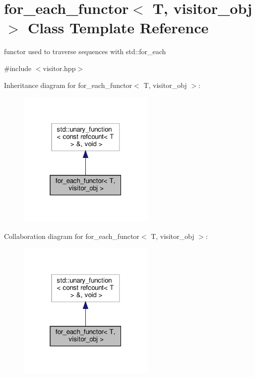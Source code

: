 \hypertarget{classfor__each__functor}{}\section{for\+\_\+each\+\_\+functor$<$ T, visitor\+\_\+obj $>$ Class Template Reference}
\label{classfor__each__functor}


functor used to traverse sequences with std\+::for\+\_\+each  




{\ttfamily \#include $<$visitor.\+hpp$>$}



Inheritance diagram for for\+\_\+each\+\_\+functor$<$ T, visitor\+\_\+obj $>$\+:
\nopagebreak
\begin{figure}[H]
\begin{center}
\leavevmode
\includegraphics[width=187pt]{d2/d6b/classfor__each__functor__inherit__graph}
\end{center}
\end{figure}


Collaboration diagram for for\+\_\+each\+\_\+functor$<$ T, visitor\+\_\+obj $>$\+:
\nopagebreak
\begin{figure}[H]
\begin{center}
\leavevmode
\includegraphics[width=187pt]{de/d8e/classfor__each__functor__coll__graph}
\end{center}
\end{figure}
